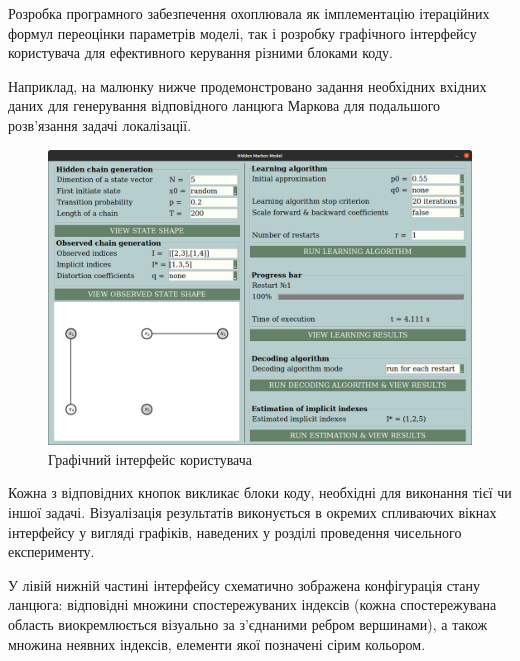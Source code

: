 \label{appendix: A}

Розробка програмного забезпечення охоплювала як імплементацію ітераційних формул переоцінки параметрів моделі, так і розробку графічного інтерфейсу користувача для ефективного керування різними блоками коду. 

Наприклад, на малюнку нижче продемонстровано задання необхідних вхідних даних для генерування відповідного ланцюга Маркова для подальшого розв'язання задачі локалізації.

\begin{figure}[H]\centering
    \includegraphics[width=1\linewidth]{Images/GUI.png}
    \caption{Графічний інтерфейс користувача}
    \label{pic: GUI}
\end{figure}

Кожна з відповідних кнопок викликає блоки коду, необхідні для виконання тієї чи іншої задачі. Візуалізація результатів виконується в окремих спливаючих вікнах інтерфейсу у вигляді графіків, наведених у розділі проведення чисельного експерименту.

У лівій нижній частині інтерфейсу схематично зображена конфігурація стану ланцюга: відповідні множини спостережуваних індексів (кожна спостережувана область виокремлюється візуально за з'єднаними ребром вершинами), а також множина неявних індексів, елементи якої позначені сірим кольором.